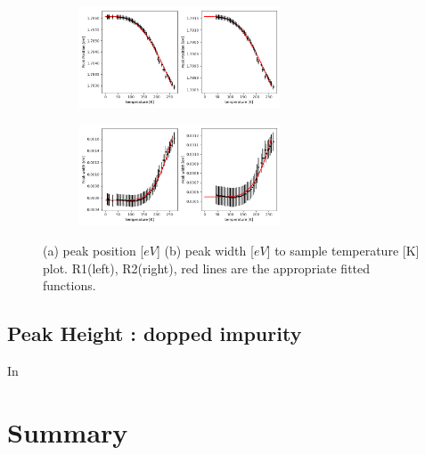 \documentclass{article}
\begin{document}
\begin{figure}[ht]
  \centering
  \begin{subfigure}[b]{6cm}
      \centering
      \includegraphics[width=6cm]{../results/Ruby_temperature_peak_fig.png}
      \caption{}
  \end{subfigure}
  \hfill
  \begin{subfigure}[b]{6cm}
      \centering
      \includegraphics[width=6cm]{../results/Ruby_temperature_width_fig.png}
      \caption{}
  \end{subfigure}

  \caption{(a) peak position [$eV$] (b) peak width [$eV$] to sample temperature [K] plot. R1(left), R2(right), red lines are the appropriate fitted functions.}
  \label{fig:Ruby_temperature_results}
\end{figure}

\subsection{Peak Height : dopped impurity}
\label{results:peak_height}
In \cite{doping_ratio}

\section{Summary}



\end{document}
